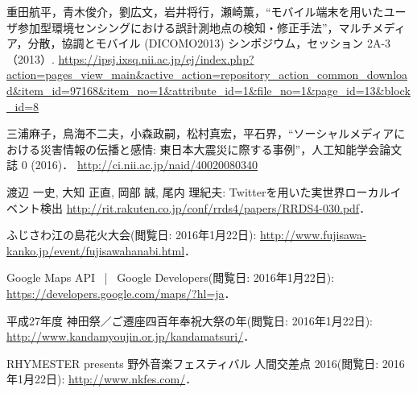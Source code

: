 \begin{thebibliography}{99}

        重田航平，青木俊介，劉広文，岩井将行，瀬崎薫，“モバイル端末を用いたユーザ参加型環境センシングにおける誤計測地点の検知・修正手法”，マルチメディア，分散，協調とモバイル (DICOMO2013) シンポジウム，セッション 2A-3（2013）.
         \url{https://ipsj.ixsq.nii.ac.jp/ej/index.php?action=pages_view_main&active_action=repository_action_common_download&item_id=97168&item_no=1&attribute_id=1&file_no=1&page_id=13&block_id=8}

         三浦麻子，鳥海不二夫，小森政嗣，松村真宏，平石界，“ソーシャルメディアにおける災害情報の伝播と感情: 東日本大震災に際する事例”，人工知能学会論文誌 0 (2016)．
         \url{http://ci.nii.ac.jp/naid/40020080340}

        渡辺 一史, 大知 正直, 岡部 誠, 尾内 理紀夫:
        Twitterを用いた実世界ローカルイベント検出
        \url{http://rit.rakuten.co.jp/conf/rrds4/papers/RRDS4-030.pdf}．

        ふじさわ江の島花火大会(閲覧日: 2016年1月22日):
        \url{http://www.fujisawa-kanko.jp/event/fujisawahanabi.html}．

        Google Maps API  |  Google Developers(閲覧日: 2016年1月22日):
        \url{https://developers.google.com/maps/?hl=ja}．

        平成27年度 神田祭／ご遷座四百年奉祝大祭の年(閲覧日: 2016年1月22日):
        \url{http://www.kandamyoujin.or.jp/kandamatsuri/}．

        RHYMESTER presents 野外音楽フェスティバル 人間交差点 2016(閲覧日: 2016年1月22日):
        \url{http://www.nkfes.com/}．


\end{thebibliography}
